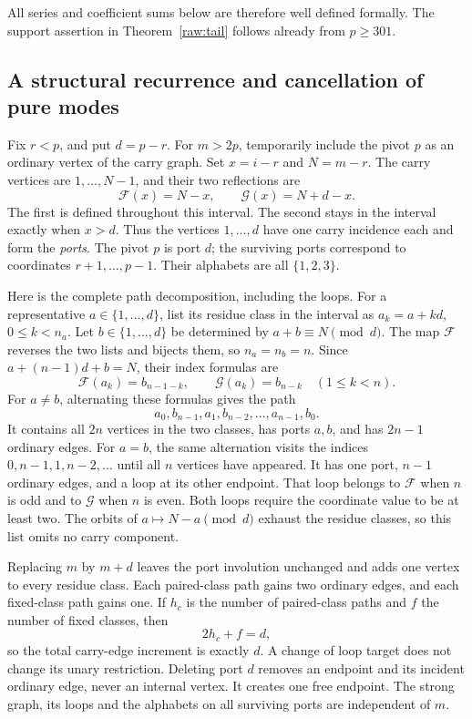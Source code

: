 \documentclass[11pt]{amsart}
\theoremstyle{definition}
\theoremstyle{remark}
\numberwithin{equation}{section}
\begin{document}
All series and coefficient sums below are therefore well defined formally.
The support assertion in Theorem~\ref{raw:tail} follows already from
$p\ge301$.

\subsection{A structural recurrence and cancellation of pure modes}\label{raw:topology}

Fix $r<p$, and put $d=p-r$.  For $m>2p$, temporarily include the pivot
$p$ as an ordinary vertex of the carry graph.  Set $x=i-r$ and $N=m-r$.
The carry vertices are $1,\ldots,N-1$, and their two reflections are
\begin{equation}\label{raw:reflections}
 \mathcal F(x)=N-x,\qquad \mathcal G(x)=N+d-x.
\end{equation}
The first is defined throughout this interval.  The second stays in the
interval exactly when $x>d$.  Thus the vertices $1,\ldots,d$ have one
carry incidence each and form the \emph{ports}.  The pivot $p$ is port
$d$; the surviving ports correspond to coordinates $r+1,\ldots,p-1$.
Their alphabets are all $\{1,2,3\}$.

Here is the complete path decomposition, including the loops.  For a
representative $a\in\{1,\ldots,d\}$, list its residue class in the interval as
$a_k=a+kd$, $0\le k<n_a$.  Let $b\in\{1,\ldots,d\}$ be determined by
$a+b\equiv N\pmod d$.  The map $\mathcal F$ reverses the two lists and
bijects them, so $n_a=n_b=n$.  Since $a+(n-1)d+b=N$, their index formulas are
\[
 \mathcal F(a_k)=b_{n-1-k},\qquad
 \mathcal G(a_k)=b_{n-k}\quad(1\le k<n).
\]
For $a\ne b$, alternating these formulas gives the path
\[
 a_0,b_{n-1},a_1,b_{n-2},\ldots,a_{n-1},b_0.
\]
It contains all $2n$ vertices in the two classes, has ports $a,b$, and
has $2n-1$ ordinary edges.  For $a=b$, the same alternation visits the
indices $0,n-1,1,n-2,\ldots$ until all $n$ vertices have appeared.  It
has one port, $n-1$ ordinary edges, and a loop at its other endpoint.
That loop belongs to $\mathcal F$ when $n$ is odd and to $\mathcal G$
when $n$ is even.  Both loops require the coordinate value to be at
least two.  The orbits of $a\mapsto N-a\pmod d$ exhaust the residue
classes, so this list omits no carry component.

Replacing $m$ by $m+d$ leaves the port involution unchanged and adds one
vertex to every residue class.  Each paired-class path gains two
ordinary edges, and each fixed-class path gains one.  If $h_c$ is the
number of paired-class paths and $f$ the number of fixed classes, then
\[
 2h_c+f=d,
\]
so the total carry-edge increment is exactly $d$.  A change of loop
target does not change its unary restriction.  Deleting port $d$ removes
an endpoint and its incident ordinary edge, never an internal vertex.
It creates one free endpoint.  The strong graph, its loops and the
alphabets on all surviving ports are independent of $m$.
\end{document}
